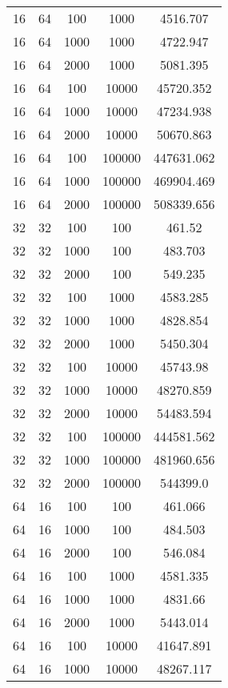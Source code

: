 \documentclass[../main.tex]{subfiles}
\begin{document}
\begin{longtable}{|c|c|c|c|c|}
16      & 64      & 100  & 1000   & 4516.707   \\
16      & 64      & 1000 & 1000   & 4722.947   \\
16      & 64      & 2000 & 1000   & 5081.395   \\
16      & 64      & 100  & 10000  & 45720.352  \\
16      & 64      & 1000 & 10000  & 47234.938  \\
16      & 64      & 2000 & 10000  & 50670.863  \\
16      & 64      & 100  & 100000 & 447631.062 \\
16      & 64      & 1000 & 100000 & 469904.469 \\
16      & 64      & 2000 & 100000 & 508339.656 \\
32      & 32      & 100  & 100    & 461.52     \\
32      & 32      & 1000 & 100    & 483.703    \\
32      & 32      & 2000 & 100    & 549.235    \\
32      & 32      & 100  & 1000   & 4583.285   \\
32      & 32      & 1000 & 1000   & 4828.854   \\
32      & 32      & 2000 & 1000   & 5450.304   \\
32      & 32      & 100  & 10000  & 45743.98   \\
32      & 32      & 1000 & 10000  & 48270.859  \\
32      & 32      & 2000 & 10000  & 54483.594  \\
32      & 32      & 100  & 100000 & 444581.562 \\
32      & 32      & 1000 & 100000 & 481960.656 \\
32      & 32      & 2000 & 100000 & 544399.0   \\
64      & 16      & 100  & 100    & 461.066    \\
64      & 16      & 1000 & 100    & 484.503    \\
64      & 16      & 2000 & 100    & 546.084    \\
64      & 16      & 100  & 1000   & 4581.335   \\
64      & 16      & 1000 & 1000   & 4831.66    \\
64      & 16      & 2000 & 1000   & 5443.014   \\
64      & 16      & 100  & 10000  & 41647.891  \\
64      & 16      & 1000 & 10000  & 48267.117  \\

\end{longtable}
\end{document}
